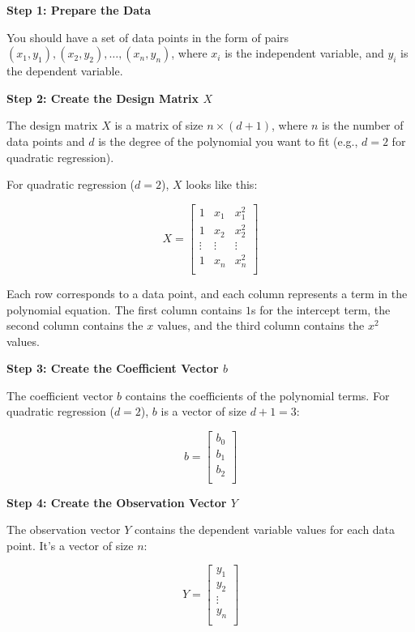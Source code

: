 \documentclass[letterpaper,12pt]{article}
\begin{document}
\textbf{Step 1: Prepare the Data}

You should have a set of data points in the form of pairs $(x_1, y_1), (x_2,
    y_2), \ldots, (x_n, y_n)$, where $x_i$ is the independent variable, and $y_i$
is the dependent variable.

\textbf{Step 2: Create the Design Matrix $X$}

The design matrix $X$ is a matrix of size $n \times (d+1)$, where $n$ is the
number of data points and $d$ is the degree of the polynomial you want to fit
(e.g., $d=2$ for quadratic regression).

For quadratic regression ($d=2$), $X$ looks like this:

\[
    X = \begin{bmatrix}
        1      & x_1    & x_1^2  \\
        1      & x_2    & x_2^2  \\
        \vdots & \vdots & \vdots \\
        1      & x_n    & x_n^2  \\
    \end{bmatrix}
\]

Each row corresponds to a data point, and each column represents a term in the
polynomial equation. The first column contains $1$s for the intercept term, the
second column contains the $x$ values, and the third column contains the $x^2$
values.

\textbf{Step 3: Create the Coefficient Vector $b$}

The coefficient vector $b$ contains the coefficients of the polynomial terms.
For quadratic regression ($d=2$), $b$ is a vector of size $d+1 = 3$:

\[
    b = \begin{bmatrix}
        b_0 \\
        b_1 \\
        b_2 \\
    \end{bmatrix}
\]

\textbf{Step 4: Create the Observation Vector $Y$}

The observation vector $Y$ contains the dependent variable values for each data
point. It's a vector of size $n$:

\[
    Y = \begin{bmatrix}
        y_1    \\
        y_2    \\
        \vdots \\
        y_n    \\
    \end{bmatrix}
\]
\end{document}
